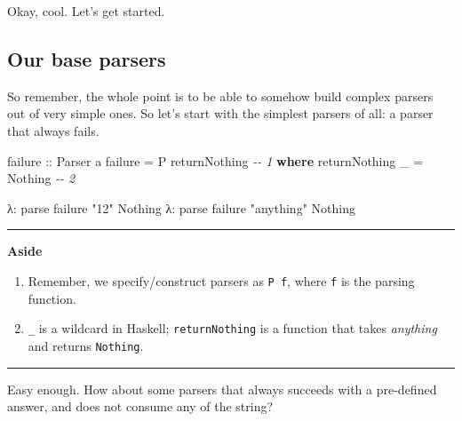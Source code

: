 \documentclass[]{article}
\newenvironment{Shaded}{}{}
\newcommand{\CommentTok}[1]{\textcolor[rgb]{0.38,0.63,0.69}{\textit{#1}}}
\newcommand{\DataTypeTok}[1]{\textcolor[rgb]{0.56,0.13,0.00}{#1}}
\newcommand{\KeywordTok}[1]{\textcolor[rgb]{0.00,0.44,0.13}{\textbf{#1}}}
\newcommand{\NormalTok}[1]{#1}
\newcommand{\OperatorTok}[1]{\textcolor[rgb]{0.40,0.40,0.40}{#1}}
\newcommand{\OtherTok}[1]{\textcolor[rgb]{0.00,0.44,0.13}{#1}}
\newcommand{\StringTok}[1]{\textcolor[rgb]{0.25,0.44,0.63}{#1}}
\begin{document}
Okay, cool. Let's get started.

\hypertarget{our-base-parsers}{%
\subsection{Our base parsers}\label{our-base-parsers}}

So remember, the whole point is to be able to somehow build complex parsers out
of very simple ones. So let's start with the simplest parsers of all: a parser
that always fails.

\begin{Shaded}
\begin{Highlighting}[]
\OtherTok{failure ::} \DataTypeTok{Parser}\NormalTok{ a}
\NormalTok{failure }\OtherTok{=} \DataTypeTok{P}\NormalTok{ returnNothing                   }\CommentTok{{-}{-} 1}
    \KeywordTok{where}
\NormalTok{        returnNothing \_ }\OtherTok{=} \DataTypeTok{Nothing}           \CommentTok{{-}{-} 2}
\end{Highlighting}
\end{Shaded}

\begin{Shaded}
\begin{Highlighting}[]
\NormalTok{λ}\OperatorTok{:}\NormalTok{ parse failure }\StringTok{"12"}
\DataTypeTok{Nothing}
\NormalTok{λ}\OperatorTok{:}\NormalTok{ parse failure }\StringTok{"anything"}
\DataTypeTok{Nothing}
\end{Highlighting}
\end{Shaded}

\begin{center}\rule{0.5\linewidth}{\linethickness}\end{center}

\textbf{Aside}

\begin{enumerate}
\def\labelenumi{\arabic{enumi}.}
\tightlist
\item
  Remember, we specify/construct parsers as \texttt{P\ f}, where \texttt{f} is
  the parsing function.
\item
  \texttt{\_} is a wildcard in Haskell; \texttt{returnNothing} is a function
  that takes \emph{anything} and returns \texttt{Nothing}.
\end{enumerate}

\begin{center}\rule{0.5\linewidth}{\linethickness}\end{center}

Easy enough. How about some parsers that always succeeds with a pre-defined
answer, and does not consume any of the string?
\end{document}
